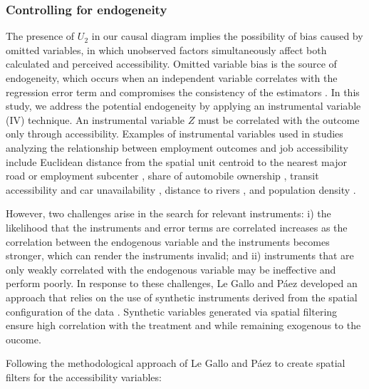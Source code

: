 \documentclass[preprint, 3p,
authoryear]{elsarticle} %
\begin{document}
\subsubsection{Controlling for
endogeneity}\label{controlling-for-endogeneity}

The presence of \(U_2\) in our causal diagram implies the possibility of
bias caused by omitted variables, in which unobserved factors
simultaneously affect both calculated and perceived accessibility.
Omitted variable bias is the source of endogeneity, which occurs when an
independent variable correlates with the regression error term and
compromises the consistency of the estimators
\citep{antonakis2010, cunningham2021causal, huntington-klein2021}. In
this study, we address the potential endogeneity by applying an
instrumental variable (IV) technique. An instrumental variable \(Z\)
must be correlated with the outcome only through accessibility. Examples
of instrumental variables used in studies analyzing the relationship
between employment outcomes and job accessibility include Euclidean
distance from the spatial unit centroid to the nearest major road or
employment subcenter \citep{delmelle2021, jin2018}, share of automobile
ownership \citep{Hu2017}, transit accessibility and car unavailability
\citep{johnson2017}, distance to rivers \citep{duarte2023, luz2022}, and
population density \citep{bastiaanssen2021, bastiaanssen2025}.

However, two challenges arise in the search for relevant instruments: i)
the likelihood that the instruments and error terms are correlated
increases as the correlation between the endogenous variable and the
instruments becomes stronger, which can render the instruments invalid;
and ii) instruments that are only weakly correlated with the endogenous
variable may be ineffective and perform poorly. In response to these
challenges, Le Gallo and Páez \citeyearpar{legallo2013} developed an
approach that relies on the use of synthetic instruments derived from
the spatial configuration of the data
\citep[see][]{getis_comparative_2002, griffith_spatial_2003}. Synthetic
variables generated via spatial filtering ensure high correlation with
the treatment and while remaining exogenous to the oucome.

Following the methodological approach of Le Gallo and Páez
\citeyearpar{legallo2013} to create spatial filters for the
accessibility variables:
\end{document}

